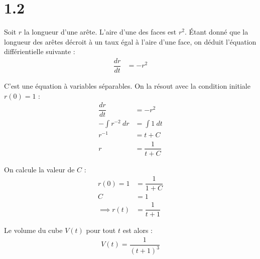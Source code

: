 \section*{1.2}

Soit $r$ la longueur d'une arête. L'aire d'une des faces est $r^2$. Étant donné
que la longueur des arêtes décroit à un taux égal à l'aire d'une face, on déduit
l'équation différientielle suivante :
\begin{align*}
    \dfrac{dr}{dt} &= -r^2
\end{align*}

C'est une équation à variables séparables. On la résout avec la condition
initiale $r(0)=1$ :
\begin{align*}
    \dfrac{dr}{dt} &= -r^2 \\
    -\int{r^{-2}\ dr} &= \int{1\ dt} \\
    r^{-1} &= t + C \\
    r &= \dfrac{1}{t+C}
\end{align*}

On calcule la valeur de $C$ :
\begin{align*}
    r(0) = 1 &= \dfrac{1}{1+C} \\
    C &= 1 \\
    \implies r(t) &= \dfrac{1}{t+1}
\end{align*}

Le volume du cube $V(t)$ pour tout $t$ est alors :
\begin{align*}
    V(t) = \dfrac{1}{(t+1)^3}
\end{align*}
